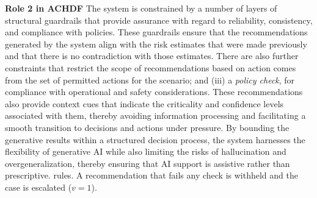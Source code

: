 \documentclass[journal]{IEEEtran}
\theoremstyle{plain}
\theoremstyle{definition}
\providecommand{\DIFaddtex}[1]{{\protect\color{blue} \sf #1}} %
\providecommand{\DIFdeltex}[1]{{\protect\color{red} \scriptsize #1}} %
\providecommand{\DIFaddbegin}{} %
\providecommand{\DIFaddend}{} %
\providecommand{\DIFdelbegin}{} %
\providecommand{\DIFdelend}{} %
\providecommand{\DIFadd}[1]{\texorpdfstring{\DIFaddtex{#1}}{#1}} %
\providecommand{\DIFdel}[1]{\texorpdfstring{\DIFdeltex{#1}}{}} %
\newcommand{\DIFscaledelfig}{0.5}
\newlength{\DIFdelgraphicswidth} %
\newlength{\DIFdelgraphicsheight} %
\newcommand{\DIFaddincludegraphics}[2][]{{\color{blue}\fbox{\DIFOincludegraphics[#1]{#2}}}} %
\newcommand{\DIFdelincludegraphics}[2][]{%
\sbox{\DIFdelgraphicsbox}{\DIFOincludegraphics[#1]{#2}}%
\settoboxwidth{\DIFdelgraphicswidth}{\DIFdelgraphicsbox} %
\settoboxtotalheight{\DIFdelgraphicsheight}{\DIFdelgraphicsbox} %
\scalebox{\DIFscaledelfig}{%
\parbox[b]{\DIFdelgraphicswidth}{\usebox{\DIFdelgraphicsbox}\\[-\baselineskip] \rule{\DIFdelgraphicswidth}{0em}}\llap{\resizebox{\DIFdelgraphicswidth}{\DIFdelgraphicsheight}{%
\setlength{\unitlength}{\DIFdelgraphicswidth}%
\begin{picture}(1,1)%
\thicklines\linethickness{2pt} %
{\color[rgb]{1,0,0}\put(0,0){\framebox(1,1){}}}%
{\color[rgb]{1,0,0}\put(0,0){\line( 1,1){1}}}%
{\color[rgb]{1,0,0}\put(0,1){\line(1,-1){1}}}%
\end{picture}%
}\hspace*{3pt}}} %
} %
\DeclareRobustCommand{\DIFaddbegin}{\DIFOaddbegin \let\includegraphics\DIFaddincludegraphics} %
\DeclareRobustCommand{\DIFaddend}{\DIFOaddend \let\includegraphics\DIFOincludegraphics} %
\DeclareRobustCommand{\DIFdelbegin}{\DIFOdelbegin \let\includegraphics\DIFdelincludegraphics} %
\DeclareRobustCommand{\DIFdelend}{\DIFOaddend \let\includegraphics\DIFOincludegraphics} %
\begin{document}
\DIFdel{\textbf{Role 2 in ACHDF}
    The system is constrained by a number of layers of structural guardrails that provide assurance with regard to reliability, consistency, and compliance with policies. These guardrails ensure that the recommendations generated by the system align with the risk estimates that were made previously and that there is no contradiction with those estimates.
    There are also further constraints that restrict the scope of recommendations based on }\DIFdelend \DIFaddbegin \DIFadd{action comes from the set of permitted actions for the scenario; and (iii) a \emph{policy check}, for compliance with }\DIFaddend operational and safety \DIFdelbegin \DIFdel{considerations. These recommendations also provide context cues that indicate the criticality and confidence levels associated with them, thereby avoiding information processing and facilitating a smooth transition to decisions and actions under pressure.
By bounding the generative results within a structured decision process, the system harnesses the flexibility of generative AI while also limiting the risks of hallucination and overgeneralization, thereby ensuring that AI support is assistive rather than prescriptive. }%
\DIFdelend \DIFaddbegin \DIFadd{rules. A recommendation that fails any check is withheld and the case is escalated ($v=1$).
}\DIFaddend 
\end{document}
